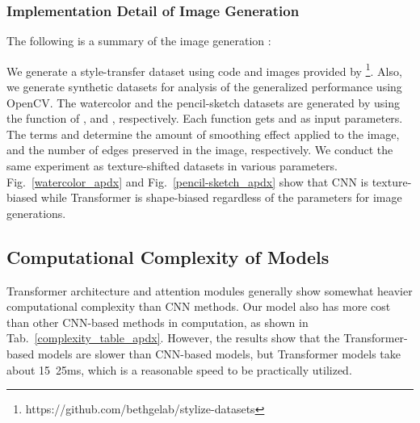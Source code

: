\documentclass[letterpaper]{article} \usepackage{aaai23}  \usepackage{times}  \usepackage{helvet}  \usepackage{courier}  \usepackage[hyphens]{url}  \usepackage{graphicx} \urlstyle{rm} \def\UrlFont{\rm}  \usepackage{natbib}  \usepackage{caption} \frenchspacing  \setlength{\pdfpagewidth}{8.5in} \setlength{\pdfpageheight}{11in} \usepackage{algorithm}
\newcommand{\tabref}[1]{Tab.~\ref{#1}}
\newcommand{\figref}[1]{Fig.~\ref{#1}}
\begin{document}
\subsubsection{Implementation Detail of Image Generation}
The following is a summary of the image generation :
\begin{table}[!h]
\end{table}

We generate a style-transfer dataset using code and images provided by \cite{geirhos2018imagenet}\footnote{https://github.com/bethgelab/stylize-datasets}. Also, we generate synthetic datasets for analysis of the generalized performance using OpenCV. The watercolor and the pencil-sketch datasets are generated by using the function of , and , respectively. Each function gets  and  as input parameters. The terms  and  determine the amount of smoothing effect applied to the image, and the number of edges preserved in the image, respectively. We conduct the same experiment as texture-shifted datasets in various parameters. \figref{watercolor_apdx} and \figref{pencil-sketch_apdx} show that CNN is texture-biased while Transformer is shape-biased regardless of the parameters for image generations.


\subsection{Computational Complexity of Models}
Transformer architecture and attention modules generally show somewhat heavier computational complexity than CNN methods. Our model also has more cost than other CNN-based methods in computation, as shown in \tabref{complexity_table_apdx}. However, the results show that the Transformer-based models are slower than CNN-based models, but Transformer models take about 15~25ms, which is a reasonable speed to be practically utilized. 
\end{document}
